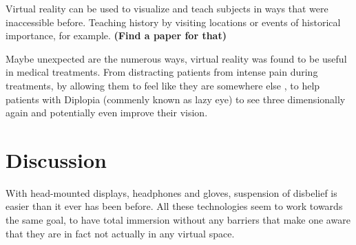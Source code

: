 \documentclass[11pt]{article}
\begin{document}
	Virtual reality can be used to visualize and teach subjects in ways that were inaccessible before. Teaching history by visiting locations or events of historical importance, for example. \textbf{(Find a paper for that)}
	
	Maybe unexpected are the numerous ways, virtual reality was found to be useful in medical treatments. From distracting patients from intense pain during treatments, by allowing them to feel like they are somewhere else \cite{hoffman14}, %
	to help patients with Diplopia (commenly known as lazy eye) to see three dimensionally again and potentially even improve their vision. \cite{blaha2014diplopia}


	
	
	
	


\section{Discussion}
With head-mounted displays, headphones and gloves, suspension of disbelief is easier than it ever has been before. All these technologies seem to work towards the same goal, to have total immersion without any barriers that make one aware that they are in fact not actually in any virtual space.
\end{document}
